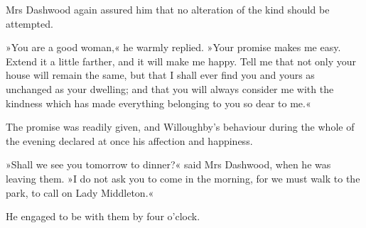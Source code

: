 Mrs Dashwood again assured him that no alteration of the kind should be attempted.

»You are a good woman,« he warmly replied. »Your promise makes me easy. Extend it a little farther, and it will make me happy. Tell me that not only your house will remain the same, but that I shall ever find you and yours as unchanged as your dwelling; and that you will always consider me with the kindness which has made everything belonging to you so dear to me.«

The promise was readily given, and Willoughby’s behaviour during the whole of the evening declared at once his affection and happiness.

»Shall we see you tomorrow to dinner?« said Mrs Dashwood, when he was leaving them. »I do not ask you to come in the morning, for we must walk to the park, to call on Lady Middleton.«

He engaged to be with them by four o’clock.